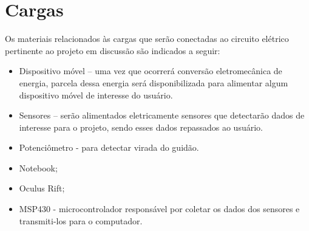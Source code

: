 \section{Cargas}

Os materiais relacionados às cargas que serão conectadas ao circuito elétrico pertinente ao projeto em discussão são indicados a seguir:

\begin{itemize}
\item Dispositivo móvel – uma vez que ocorrerá conversão eletromecânica de energia, parcela dessa energia será disponibilizada para alimentar algum
  dispositivo móvel de interesse do usuário.
\item Sensores – serão alimentados eletricamente sensores que detectarão dados de interesse para o projeto, sendo esses dados repassados ao usuário.
\item Potenciômetro - para detectar virada do guidão.
\item Notebook;
\item Oculus Rift;
\item MSP430 - microcontrolador responsável por coletar os dados dos sensores e transmiti-los para o computador.
\end{itemize}



